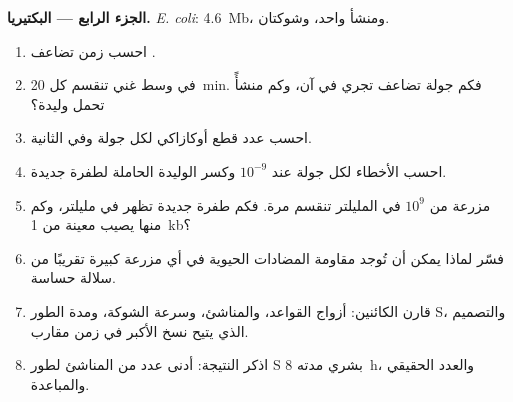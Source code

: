 \begin{problem}
\medskip
\noindent\textbf{الجزء الرابع --- البكتيريا.}
\emph{E. coli}: \qty{4.6}{Mb}، ومنشأ واحد، وشوكتان.
\begin{enumerate}[resume]
  \item احسب زمن تضاعف .
  \item في وسط غني تنقسم  كل \qty{20}{min}. فكم جولة تضاعف
        تجري في آن، وكم منشأً تحمل  وليدة؟
  \item احسب عدد قطع أوكازاكي لكل جولة وفي الثانية.
  \item احسب الأخطاء لكل جولة عند $10^{-9}$ وكسر  الوليدة
        الحاملة لطفرة جديدة.
  \item مزرعة من $10^9$  في المليلتر تنقسم مرة. فكم طفرة جديدة
        تظهر في مليلتر، وكم منها يصيب  معينة من \qty{1}{kb}؟
  \item فسّر لماذا يمكن أن تُوجد مقاومة المضادات الحيوية في أي مزرعة
        كبيرة تقريبًا من سلالة حساسة.
  \item قارن الكائنين: أزواج القواعد، والمناشئ، وسرعة الشوكة، ومدة
        الطور S، والتصميم الذي يتيح نسخ  الأكبر في زمن مقارب.
  \item اذكر النتيجة: أدنى عدد من المناشئ لطور S بشري مدته
        \qty{8}{h}، والعدد الحقيقي والمباعدة.
\end{enumerate}
\end{problem}
